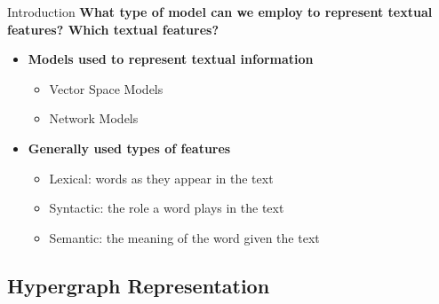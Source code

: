 \documentclass[10pt,xcolor=table]{beamer}
\begin{document}
\begin{frame}{Introduction}
\large \textbf{What type of model can we employ to represent textual features? Which textual features?}
\vspace{.5cm}
\begin{itemize}
	\item \textbf{Models used to represent textual information}
		\begin{itemize}
		\item Vector Space Models \cite{manning1999foundations}
		\item Network Models \cite{2004.Mihalcea.SemanticNetworkPageRank}
		
		\end{itemize}
	\vspace{.5cm}
	\item \textbf{Generally used types of features} 
		\begin{itemize}
		\item Lexical: words as they appear in the text
		\item Syntactic: the role a word plays in the text
		\item Semantic: the meaning of the word given the text
		\end{itemize}
\end{itemize}
\vspace{\textheight}
\end{frame}

\subsection{Hypergraph Representation}
\end{document}
